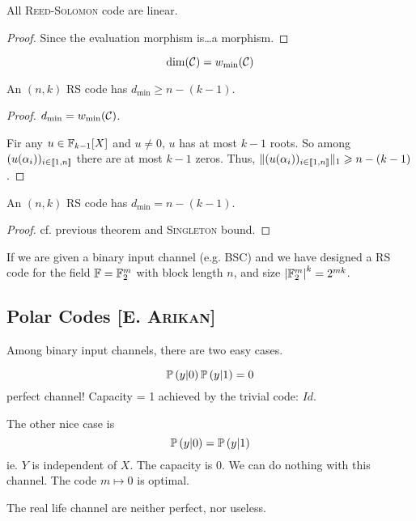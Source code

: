 \begin{proposition}
    All \textsc{Reed-Solomon} code are linear.
\end{proposition}
\begin{proof}
    Since the evaluation morphism is\dots a morphism.
\end{proof}

\begin{corollary}
    \[
        \operatorname{dim}(\mathcal{C}) = w_{\min}(\mathcal{C})
    \]
\end{corollary}

\begin{theorem}
    An $(n,k)$ RS code has $d_{\min} \geqslant n-(k-1)$.
\end{theorem}
\begin{proof}
    $d_{\min} = w_{\min}(\mathcal{C})$.
    
    Fir any $u\in\mathbb{F}_{k-1}[X]$ and $u\neq 0$, $u$ has at most $k-1$ roots. So among $(u(\alpha_i))_{i\in\left\llbracket 1,n \right\rrbracket}$ there are at most $k-1$ zeros. Thus, $\lVert (u(\alpha_i))_{i\in\left\llbracket 1,n \right\rrbracket} \rVert_1 \geqslant n-(k-1)$.
\end{proof}

\begin{corollary}
    An $(n,k)$ RS code has $d_{\min} = n-(k-1)$.
\end{corollary}
\begin{proof}
    cf. previous theorem and \textsc{Singleton} bound.
\end{proof}

If we are given a binary input channel (e.g. BSC) and we have designed a RS code for the field $\mathbb{F} = \mathbb{F}_2^m$ with block length $n$, and size $\left\lvert\mathbb{F}_2^m\right\rvert^k = 2^{mk}$.

\subsection[Polar Codes]{Polar Codes [E. \textsc{Arikan}]}

Among binary input channels, there are two easy cases.

\[
    \mathbb{P}\left( y \vert 0 \right) \mathbb{P}\left( y \vert 1 \right) = 0
\]
perfect channel! Capacity = 1 achieved by the trivial code: $Id$.

The other nice case is 
\[
    \mathbb{P}\left( y\vert 0 \right) = \mathbb{P}\left( y \vert 1 \right)
\]
ie. $Y$ is independent of $X$. The capacity is 0. We can do nothing with this channel. The code $m\mapsto 0$ is optimal.

The real life channel are neither perfect, nor useless.

